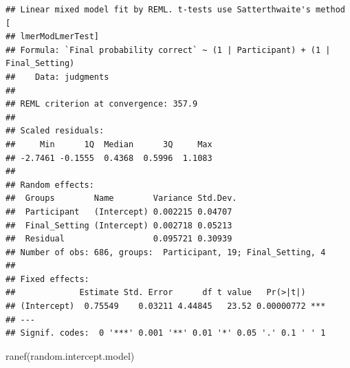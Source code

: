 \documentclass[
]{article}
\newenvironment{Shaded}{\begin{snugshade}}{\end{snugshade}}
\newcommand{\AttributeTok}[1]{\textcolor[rgb]{0.77,0.63,0.00}{#1}}
\newcommand{\ConstantTok}[1]{\textcolor[rgb]{0.00,0.00,0.00}{#1}}
\newcommand{\DecValTok}[1]{\textcolor[rgb]{0.00,0.00,0.81}{#1}}
\newcommand{\FunctionTok}[1]{\textcolor[rgb]{0.00,0.00,0.00}{#1}}
\newcommand{\NormalTok}[1]{#1}
\newcommand{\OtherTok}[1]{\textcolor[rgb]{0.56,0.35,0.01}{#1}}
\newcommand{\SpecialCharTok}[1]{\textcolor[rgb]{0.00,0.00,0.00}{#1}}
\newcommand{\StringTok}[1]{\textcolor[rgb]{0.31,0.60,0.02}{#1}}
\begin{document}
\begin{Shaded}
\end{Shaded}

\begin{verbatim}
## Linear mixed model fit by REML. t-tests use Satterthwaite's method [
## lmerModLmerTest]
## Formula: `Final probability correct` ~ (1 | Participant) + (1 | Final_Setting)
##    Data: judgments
## 
## REML criterion at convergence: 357.9
## 
## Scaled residuals: 
##     Min      1Q  Median      3Q     Max 
## -2.7461 -0.1555  0.4368  0.5996  1.1083 
## 
## Random effects:
##  Groups        Name        Variance Std.Dev.
##  Participant   (Intercept) 0.002215 0.04707 
##  Final_Setting (Intercept) 0.002718 0.05213 
##  Residual                  0.095721 0.30939 
## Number of obs: 686, groups:  Participant, 19; Final_Setting, 4
## 
## Fixed effects:
##             Estimate Std. Error      df t value   Pr(>|t|)    
## (Intercept)  0.75549    0.03211 4.44845   23.52 0.00000772 ***
## ---
## Signif. codes:  0 '***' 0.001 '**' 0.01 '*' 0.05 '.' 0.1 ' ' 1
\end{verbatim}

\begin{Shaded}
\begin{Highlighting}[]
\FunctionTok{ranef}\NormalTok{(random.intercept.model)}
\end{Highlighting}
\end{Shaded}
\end{document}
